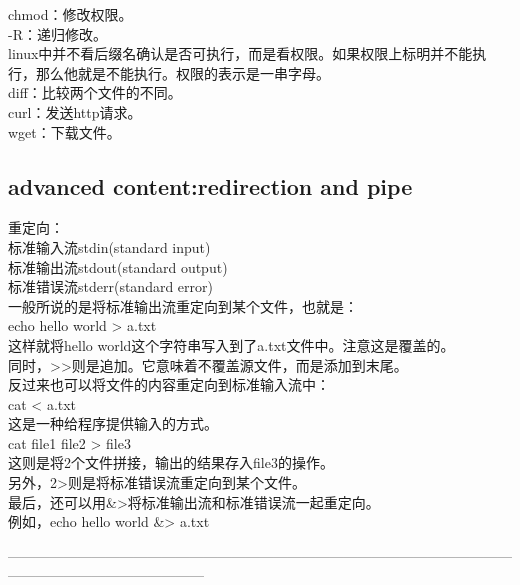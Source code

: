 \documentclass{article}
\begin{document}
\noindent
chmod：修改权限。\\
\hspace*{2em} -R：递归修改。\\
\hspace*{2em} linux中并不看后缀名确认是否可执行，而是看权限。如果权限上标明并不能执行，那么他就是不能执行。权限的表示是一串字母。\\
diff：比较两个文件的不同。\\

\noindent
curl：发送http请求。\\
wget：下载文件。\\



\subsection{advanced content:redirection and pipe}
\noindent
重定向：\\

\noindent
标准输入流stdin(standard input)\\
标准输出流stdout(standard output)\\
标准错误流stderr(standard error)\\

\noindent
一般所说的是将标准输出流重定向到某个文件，也就是：\\
echo hello world > a.txt\\
这样就将hello world这个字符串写入到了a.txt文件中。注意这是覆盖的。\\
同时，>>则是追加。它意味着不覆盖源文件，而是添加到末尾。\\

\noindent
反过来也可以将文件的内容重定向到标准输入流中：\\
cat < a.txt\\
这是一种给程序提供输入的方式。\\
cat file1 file2 > file3\\
这则是将2个文件拼接，输出的结果存入file3的操作。\\

\noindent
另外，2>则是将标准错误流重定向到某个文件。\\

\noindent
最后，还可以用\&>将标准输出流和标准错误流一起重定向。\\
例如，echo hello world \&> a.txt\\

\begin{center}
    ——————————————————————————————————————————————————\\
\end{center}
\end{document}
